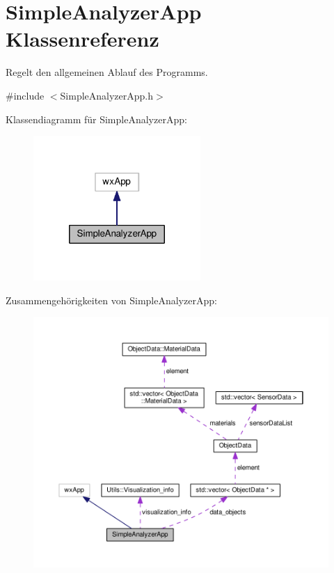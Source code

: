 \hypertarget{classSimpleAnalyzerApp}{\section{Simple\-Analyzer\-App Klassenreferenz}
\label{classSimpleAnalyzerApp}
}


Regelt den allgemeinen Ablauf des Programms.  




{\ttfamily \#include $<$Simple\-Analyzer\-App.\-h$>$}



Klassendiagramm für Simple\-Analyzer\-App\-:
\nopagebreak
\begin{figure}[H]
\begin{center}
\leavevmode
\includegraphics[width=180pt]{classSimpleAnalyzerApp__inherit__graph}
\end{center}
\end{figure}


Zusammengehörigkeiten von Simple\-Analyzer\-App\-:
\nopagebreak
\begin{figure}[H]
\begin{center}
\leavevmode
\includegraphics[width=350pt]{classSimpleAnalyzerApp__coll__graph}
\end{center}
\end{figure}
